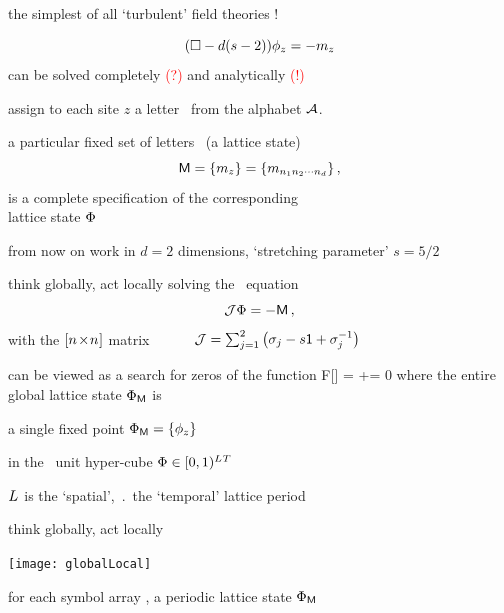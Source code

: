 \begin{frame}{the simplest of all `turbulent' field theories ! }
\begin{block}{\catlatt}
\[
 (\Box -d(s-2))\phi_{z} = - m_z
\] %
\bigskip
can be solved completely
\textcolor{red}{(?)} and analytically \textcolor{red}{(!)}
\end{block}

\bigskip
\bigskip

assign to each site $z$ a
letter \ from the alphabet $\mathcal{A}$.

\medskip

a particular fixed set
of letters  \ (a lattice state)
\[
\Mm= \{\Ssym{z}\} %
 = \{\Ssym{n_1 n_2 \cdots n_d}\}
\,,
\]
is a complete specification of the corresponding \\
lattice state $\Phi$
\bigskip

{\color{blue}\footnotesize
from now on work in $d=2$ dimensions, `stretching parameter'
$s=5/2$
}
\end{frame}

\begin{frame}{think globally, act locally}
solving the \catlatt\ equation
\[
{\cal J}\Phi= -\mathsf{M}
\,,
\]
with
the $[{n_{}}\!\times\!{n_{}}]$ matrix ~~~~~
\(
{\cal J} = \sum_{j=1}^{2}\left(\mathbf{\sigma}_j-{s}\mathsf{1}+\mathbf{\sigma}_{j}^{-1}\right)
\) %
\medskip

can be viewed as a search for zeros of the function
\beq
F[\Xx] = \jMorb\Xx+\Mm = 0
where the entire {\color{blue}global lattice state} ${\Phi}_{\mathsf{M}}$ is
\medskip

a single {\color{blue}fixed point}
${\Phi}_{\mathsf{M}}=\{\phi_z\}$

\hfill
in the \speriod{}\period{}\dmn\ unit hyper-cube $\Phi\in[0,1)^{{L_{}}{T_{}}}$
\medskip

${L_{}}$ is the `spatial',
$\period{}$ the `temporal' lattice period
\end{frame}

\begin{frame}{think globally, act locally}
    \begin{center}
\texttt{[image: globalLocal]}
    \end{center}
for each symbol array \Mm, a periodic lattice state $\Phi_{\mathsf{M}}$
\end{frame}


